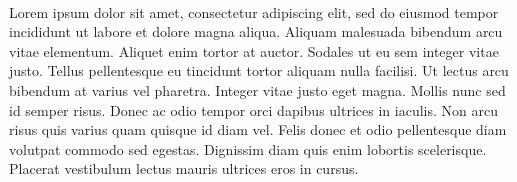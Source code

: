 
\setlength{\parindent}{0pt}
\setlength{\parskip}{1em}
\setlength{\baselineskip}{1.5em} %

\begin{center}
  \fontsize{14}{17} \\
\end{center}
\vspace{36pt} 

Lorem ipsum dolor sit amet, consectetur adipiscing elit, sed do eiusmod tempor incididunt ut labore et dolore magna aliqua. Aliquam malesuada bibendum arcu vitae elementum. Aliquet enim tortor at auctor. Sodales ut eu sem integer vitae justo. Tellus pellentesque eu tincidunt tortor aliquam nulla facilisi. Ut lectus arcu bibendum at varius vel pharetra. Integer vitae justo eget magna. Mollis nunc sed id semper risus. Donec ac odio tempor orci dapibus ultrices in iaculis. Non arcu risus quis varius quam quisque id diam vel. Felis donec et odio pellentesque diam volutpat commodo sed egestas. Dignissim diam quis enim lobortis scelerisque. Placerat vestibulum lectus mauris ultrices eros in cursus.

